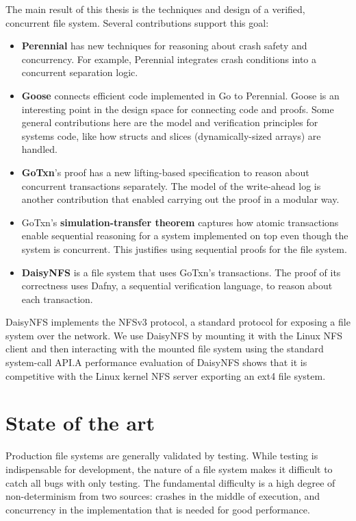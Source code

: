 The main result of this thesis is the techniques and design of a verified,
concurrent file system. Several contributions support this goal:
\begin{itemize}
  \item \textbf{Perennial} has new techniques for reasoning about crash safety
    and concurrency. For example, Perennial integrates crash conditions into a
    concurrent separation logic.
  \item \textbf{Goose} connects efficient code implemented in Go to Perennial.
    Goose is an interesting point in the design space for connecting code
    and proofs. Some general contributions here are the model and
    verification principles for systems code, like how structs and slices
    (dynamically-sized arrays) are handled.
  \item \textbf{GoTxn}'s proof has a new lifting-based specification to reason
    about concurrent transactions separately. The model of the write-ahead
    log is another contribution that enabled carrying out the proof in a modular
    way.
  \item GoTxn's \textbf{simulation-transfer theorem} captures how atomic
    transactions enable sequential reasoning for a system implemented on top
    even though the system is concurrent. This justifies using sequential proofs
    for the file system.
  \item \textbf{DaisyNFS} is a file system that uses GoTxn's transactions. The
    proof of its correctness uses Dafny, a
    sequential verification language, to reason about each transaction.
\end{itemize}

DaisyNFS implements the NFSv3 protocol, a standard protocol for exposing
a file system over the network. We use DaisyNFS by mounting it with the
Linux NFS client and then interacting with the mounted file system using
the standard system-call API.\@ A performance evaluation of DaisyNFS shows
that it is competitive with the Linux kernel NFS server exporting an
ext4 file system.

\section{State of the art}

Production file systems are generally validated by testing. While testing is
indispensable for development, the nature of a file system makes it difficult to
catch all bugs with only testing. The fundamental difficulty is a high degree of
non-determinism from two sources: crashes in the middle of execution, and
concurrency in the implementation that is needed for good performance.

